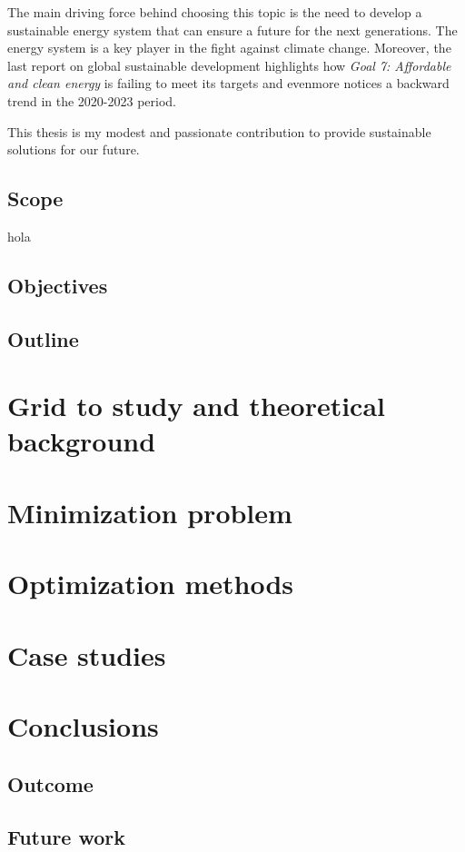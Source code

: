 \documentclass[a4paper,11pt, titlepage, twoside]{article}
\begin{document}
The main driving force behind choosing this topic is the need to develop a sustainable energy system that can
ensure a future for the next generations. The energy system is a key player in the fight against climate change. Moreover, the last
report on global sustainable development \cite{SustGoal7} highlights how \textit{Goal 7: Affordable and clean energy} is failing to meet its targets
and evenmore notices a backward trend in the 2020-2023 period.\par

This thesis is my modest and passionate contribution to provide sustainable solutions for our future.

\subsection{Scope}
hola
\subsection{Objectives}

\subsection{Outline}
\section{Grid to study and theoretical background}
\section{Minimization problem}
\section{Optimization methods}
\section{Case studies}

\section{Conclusions}
\subsection{Outcome}
\subsection{Future work}
\end{document}

